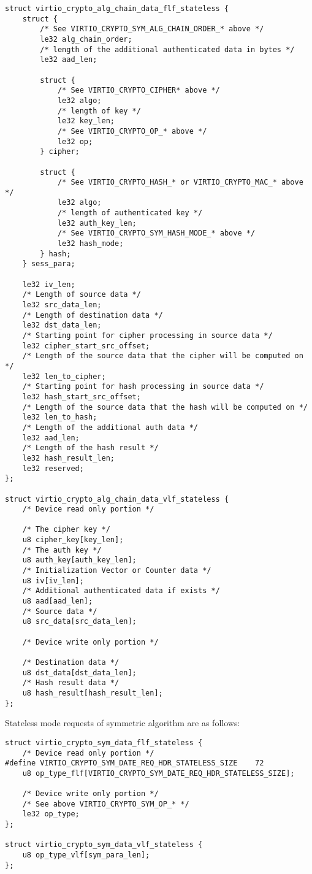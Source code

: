 \begin{lstlisting}
struct virtio_crypto_alg_chain_data_flf_stateless {
    struct {
        /* See VIRTIO_CRYPTO_SYM_ALG_CHAIN_ORDER_* above */
        le32 alg_chain_order;
        /* length of the additional authenticated data in bytes */
        le32 aad_len;

        struct {
            /* See VIRTIO_CRYPTO_CIPHER* above */
            le32 algo;
            /* length of key */
            le32 key_len;
            /* See VIRTIO_CRYPTO_OP_* above */
            le32 op;
        } cipher;

        struct {
            /* See VIRTIO_CRYPTO_HASH_* or VIRTIO_CRYPTO_MAC_* above */
            le32 algo;
            /* length of authenticated key */
            le32 auth_key_len;
            /* See VIRTIO_CRYPTO_SYM_HASH_MODE_* above */
            le32 hash_mode;
        } hash;
    } sess_para;

    le32 iv_len;
    /* Length of source data */
    le32 src_data_len;
    /* Length of destination data */
    le32 dst_data_len;
    /* Starting point for cipher processing in source data */
    le32 cipher_start_src_offset;
    /* Length of the source data that the cipher will be computed on */
    le32 len_to_cipher;
    /* Starting point for hash processing in source data */
    le32 hash_start_src_offset;
    /* Length of the source data that the hash will be computed on */
    le32 len_to_hash;
    /* Length of the additional auth data */
    le32 aad_len;
    /* Length of the hash result */
    le32 hash_result_len;
    le32 reserved;
};

struct virtio_crypto_alg_chain_data_vlf_stateless {
    /* Device read only portion */

    /* The cipher key */
    u8 cipher_key[key_len];
    /* The auth key */
    u8 auth_key[auth_key_len];
    /* Initialization Vector or Counter data */
    u8 iv[iv_len];
    /* Additional authenticated data if exists */
    u8 aad[aad_len];
    /* Source data */
    u8 src_data[src_data_len];

    /* Device write only portion */

    /* Destination data */
    u8 dst_data[dst_data_len];
    /* Hash result data */
    u8 hash_result[hash_result_len];
};
\end{lstlisting}

Stateless mode requests of symmetric algorithm are as follows:

\begin{lstlisting}
struct virtio_crypto_sym_data_flf_stateless {
    /* Device read only portion */
#define VIRTIO_CRYPTO_SYM_DATE_REQ_HDR_STATELESS_SIZE    72
    u8 op_type_flf[VIRTIO_CRYPTO_SYM_DATE_REQ_HDR_STATELESS_SIZE];

    /* Device write only portion */
    /* See above VIRTIO_CRYPTO_SYM_OP_* */
    le32 op_type;
};

struct virtio_crypto_sym_data_vlf_stateless {
    u8 op_type_vlf[sym_para_len];
};
\end{lstlisting}

